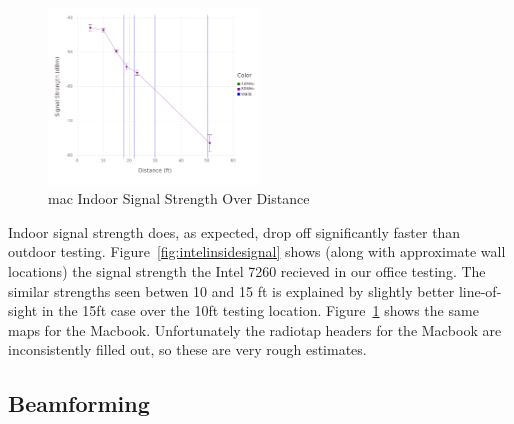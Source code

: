 \begin{figure}[!h]
\centering
\includegraphics[width=0.5\textwidth]{figures/Mac_Inside_Beamformed}
\caption{mac Indoor Signal Strength Over Distance}
\label{fig:macinsidesignal}
\end{figure}

Indoor signal strength does, as expected, drop off significantly
faster than outdoor testing. Figure~\ref{fig:intelinsidesignal} shows
(along with approximate wall locations) the signal strength the Intel
7260 recieved in our office testing. The similar strengths seen betwen
10 and 15 ft is explained by slightly better line-of-sight in the 15ft
case over the 10ft testing location. Figure~\ref{fig:macinsidesignal}
shows the same maps for the Macbook. Unfortunately the radiotap
headers for the Macbook are inconsistently filled out, so these are
very rough estimates.




\subsection{Beamforming}



